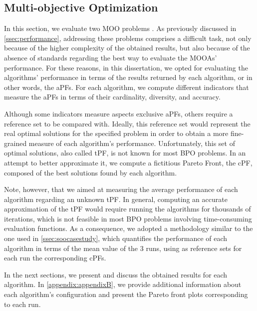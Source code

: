 \subsection{Multi-objective Optimization}

In this section, we evaluate two \ac{MOO} problems \cite{Belem2019MOO,IP2019MOO}. As previously discussed in \cref{ssec:performance}, addressing these problems comprises a difficult task, not only because of the higher complexity of the obtained results, but also because of the absence of standards regarding the best way to evaluate the \acp{MOOA}' performance. For these reasons, in this dissertation, we opted for evaluating the algorithms' performance in terms of the results returned by each algorithm, or in other words, the \acp{aPF}. For each algorithm, we compute different indicators that measure the \acp{aPF} in terms of their cardinality, diversity, and accuracy.%

Although some indicators measure aspects exclusive \acp{aPF}, others require a reference set to be compared with. Ideally, this reference set would represent the real optimal solutions for the specified problem in order to obtain a more fine-grained measure of each algorithm's performance. Unfortunately, this set of optimal solutions, also called \ac{tPF}, is not known for most \ac{BPO} problems. In an attempt to better approximate it, we compute a fictitious Pareto Front, the \ac{cPF}, composed of the best solutions found by each algorithm. 

Note, however, that we aimed at measuring the average performance of each algorithm regarding an unknown \ac{tPF}. In general, computing an accurate approximation of the \ac{tPF} would require running the algorithms for thousands of iterations, which is not feasible in most \ac{BPO} problems involving time-consuming evaluation functions. As a consequence, we adopted a methodology similar to the one used in \cref{ssec:soocasestudy}, which quantifies the performance of each algorithm in terms of the mean value of the $3$ runs, using as reference sets for each run the corresponding \acp{cPF}. 

In the next sections, we present and discuss the obtained results for each algorithm. In \cref{appendix:appendixB}, we provide additional information about each algorithm's configuration and present the Pareto front plots corresponding to each run.

